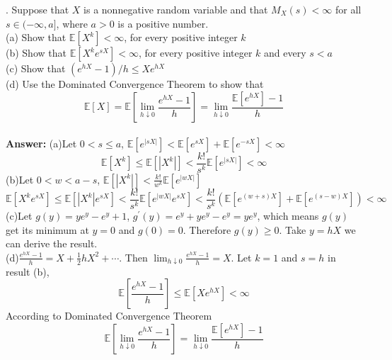 \documentclass[onecolumn, 12pt]{IEEEtran}
\begin{document}
. Suppose that $X$ is a nonnegative random variable and that $M_X(s) < \infty$ for all $s \in (-\infty, a]$, where
$a > 0$ is a positive number.\\
(a) Show that $\mathbb{E}[X^k]< \infty$, for every positive integer $k$\\
(b) Show that $\mathbb{E}[X^ke^{sX}]< \infty$, for every positive integer $k$ and every $s < a$\\
(c) Show that $(e^{hX}-1)/h\le Xe^{hX}$ \\
(d) Use the Dominated Convergence Theorem to show that
\begin{equation*}
\mathbb{E}[X] = \mathbb{E}\left[\lim_{h \downarrow 0}\frac{e^{hX}-1}{h}\right]=\lim_{h \downarrow 0}\frac{\mathbb{E}[e^{hX}]-1}{h}
\end{equation*}
\noindent 
\vspace*{0.1in}\\
\noindent 
{\bf Answer:}
(a)Let $0<s\le a$, $\mathbb{E}[e^{|sX|}]<\mathbb{E}[e^{sX}]+\mathbb{E}[e^{-sX}]<\infty$
\begin{equation*}
\mathbb{E}[X^k]\le\mathbb{E}[|X^k|]<\frac{k!}{s^k}\mathbb{E}[e^{|sX|}]<\infty
\end{equation*}
(b)Let $0<w<a-s$, $\mathbb{E}[|X^k|]<\frac{k!}{w^k}\mathbb{E}[e^{|wX|}]$
\begin{equation*}
\mathbb{E}[X^ke^{sX}]\le\mathbb{E}[|X^k|e^{sX}]<\frac{k!}{s^k}\mathbb{E}[e^{|wX|}e^{sX}]<\frac{k!}{s^k}(\mathbb{E}[e^{(w+s)X}]+\mathbb{E}[e^{(s-w)X}])<\infty
\end{equation*}
(c)Let $g(y)=ye^y-e^y+1$, $g^\prime(y)=e^y+ye^y-e^y=ye^y$, which means $g(y)$ get its minimum at $y=0$ and $g(0)=0$. Therefore $g(y)\ge 0$. Take $y=hX$ we can derive the result.\\
(d)$\frac{e^{hX}-1}{h}=X+\frac 12 hX^2+\cdots$. Then $\lim_{h \downarrow 0}\frac{e^{hX}-1}{h}=X$. Let $k=1$ and $s=h$ in result (b),
\begin{equation*}
\mathbb{E}\left[\frac{e^{hX}-1}{h}\right]\le \mathbb{E}\left[Xe^{hX}\right]<\infty
\end{equation*}
According to Dominated Convergence Theorem
\begin{equation*}
\mathbb{E}\left[\lim_{h \downarrow 0}\frac{e^{hX}-1}{h}\right]=\lim_{h \downarrow 0}\frac{\mathbb{E}[e^{hX}]-1}{h}
\end{equation*}
\noindent
\vspace*{0.3in}
\end{document}
